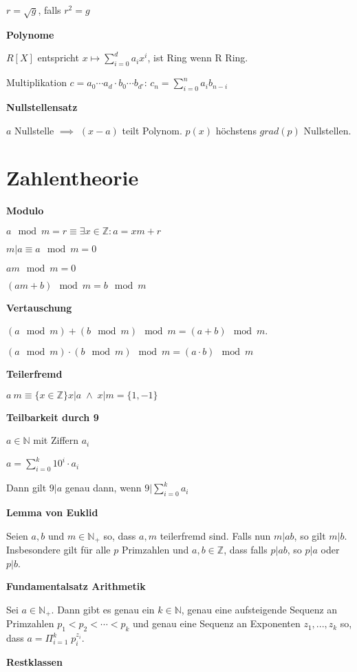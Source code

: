 \documentclass[a4paper,10pt]{article}
\newcommand{\N}{\mathbb{N}}
\newcommand{\natnum}{\mathbb{N}}
\newcommand{\Z}{\mathbb{Z}}
\newcommand{\integers}{\mathbb{Z}}
\newcommand{\modulo}{\mod}
\newcommand{\lt}{<}
\begin{document}
\begin{multicols}{3}
$r = \sqrt{g}$, falls $r^2 = g$

\textbf{Polynome}

$R[X]$ entspricht $x \mapsto \sum_{i=0}^d a_i x^i$, ist Ring wenn R Ring.

Multiplikation $c=a_0\cdots a_d \cdot b_0\cdots b_{d'}$: $c_n = \sum_{i=0}^n a_i b_{n-i}$

\textbf{Nullstellensatz}

$a$ Nullstelle $\implies$ $(x-a)$ teilt Polynom. $p(x)$ höchstens $grad(p)$ Nullstellen.

\section{Zahlentheorie}

\textbf{Modulo}

$a \mod m = r \equiv \exists x \in \Z: a = xm +r$

$m|a \equiv a \mod m = 0$

$am \modulo m = 0$

$(am+b) \modulo m = b \modulo m$

\textbf{Vertauschung}

$(a \modulo m) + (b \modulo m) \modulo m = (a+b) \modulo m$.

$(a \modulo m) \cdot (b \modulo m) \modulo m = (a \cdot b) \modulo m$

\textbf{Teilerfremd}

$a \ m \equiv \{x \in \integers\}{x |a \; \wedge \; x | m} = \{1,-1\}$

\textbf{Teilbarkeit durch 9}

$a \in \N$ mit Ziffern $a_i$

$a = \sum_{i=0}^k 10^i \cdot a_i$

Dann gilt $9 | a$ genau dann, wenn $9 | \sum_{i=0}^k a_i$

\textbf{Lemma von Euklid}

Seien $a,b$ und $m \in \natnum_+$ so, dass $a,m$ teilerfremd sind. Falls nun $m | ab$, so gilt $m|b$.
Insbesondere gilt für alle $p$ Primzahlen und $a,b \in \integers$, dass falls $p | ab$, so $p | a$ oder $p | b$. 

\textbf{Fundamentalsatz Arithmetik}

Sei $a \in \natnum_+$. Dann gibt es genau ein 
$k \in \natnum$, genau eine aufsteigende Sequenz an Primzahlen 
$p_1 \lt p_2 \lt \cdots \lt p_k$ und genau eine Sequenz an Exponenten $z_1,...,z_k$ so, dass $a = \Pi_{i=1}^k \; p_i^{z_i}.$ 

\textbf{Restklassen}


\end{multicols}
\end{document}

